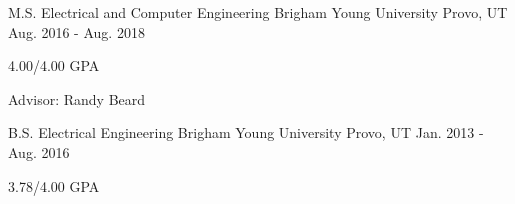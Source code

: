 

\begin{cventries}

\cventry
	{M.S. Electrical and Computer Engineering} %
	{Brigham Young University} %
	{Provo, UT} %
	{Aug. 2016 - Aug. 2018} %
	{
		\begin{cvitems} %
			\item 4.00/4.00 GPA
			\item Advisor: Randy Beard
		\end{cvitems}
	}
	
  \cventry
    {B.S. Electrical Engineering} %
    {Brigham Young University} %
    {Provo, UT} %
    {Jan. 2013 - Aug. 2016} %
    {
      \begin{cvitems} %
        \item 3.78/4.00 GPA
      \end{cvitems}
    }

\end{cventries}
